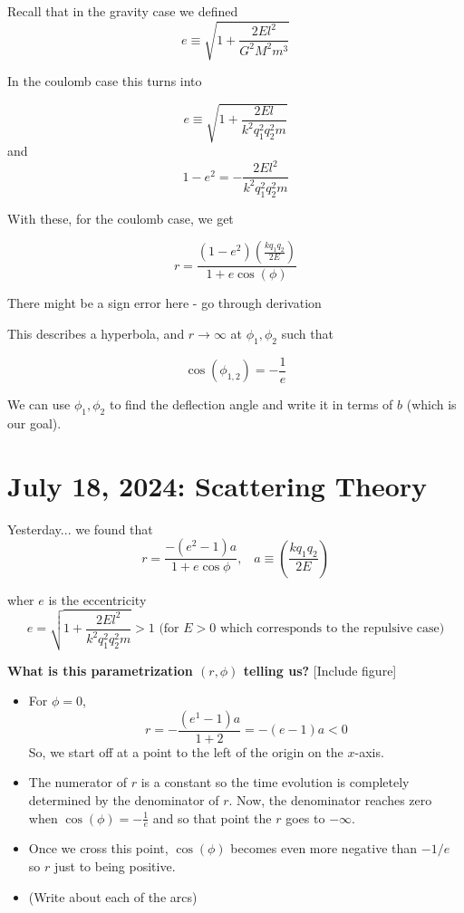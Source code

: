 \documentclass[11pt]{article}
\begin{document}
Recall that in the gravity case we defined 
\[ e \equiv \sqrt{1 + \frac{2E l^2}{G^2 M^2 m^3}} \]


In the coulomb case this turns into 

\[ e \equiv \sqrt{1 + \frac{2El}{k^2 q_1^2 q_2^2 m}} \]
and 
\[ 1 - e^2 = -\frac{2E l^2}{k^2 q_1^2 q_2^2 m} \]

With these, for the coulomb case, we get 

\[ \boxed{r = \frac{(1-e^2) \left(\frac{kq_1 q_2}{2E}\right) }{1+e\cos(\phi)} } \]

\begin{note}
  {There might be a sign error here - go through derivation}
\end{note}

This describes a hyperbola, and $r \rightarrow \infty$ at $\phi_1, \phi_2$ such that 

\[ \cos(\phi_{1,2}) = -\frac{1}{e}  \]

We can use $\phi_1, \phi_2$ to find the deflection angle and write it in terms of $b$ (which is our goal).

\pagebreak
\section{July 18, 2024: Scattering Theory}

\vskip 1cm
Yesterday... we found that 
\[ r = \frac{-(e^2 - 1) a}{1 + e\cos\phi},\;\;\; a \equiv \left(\frac{kq_1 q_2}{2E}\right) \]

wher $e$ is the eccentricity
\[ e = \sqrt{1 + \frac{2El^2}{k^2 q_1^2 q_2^2 m}} > 1 \text{ (for $E > 0$ which corresponds to the repulsive case)}\]

\textbf{What is this parametrization $(r, \phi)$ telling us?
}
\vskip 0.5cm
[Include figure]
\vskip 0.5cm

\begin{itemize}
  \item For $\phi = 0$, 
  \[ r = - \frac{(e^1 - 1)a}{1 + 2} = -(e-1)a < 0 \]
  So, we start off at a point to the left of the origin on the $x$-axis. 

  \item The numerator of $r$ is a constant so the time evolution is completely determined by the denominator of $r$. Now, the denominator reaches zero when $\cos(\phi) = -\frac{1}{e}$ and so that point the $r$ goes to $-\infty$.
  
  \item Once we cross this point, $\cos(\phi)$ becomes even more negative than $-1/e$ so $r$ just to being positive.
  
  \item (Write about each of the arcs)
\end{itemize}
\end{document}

